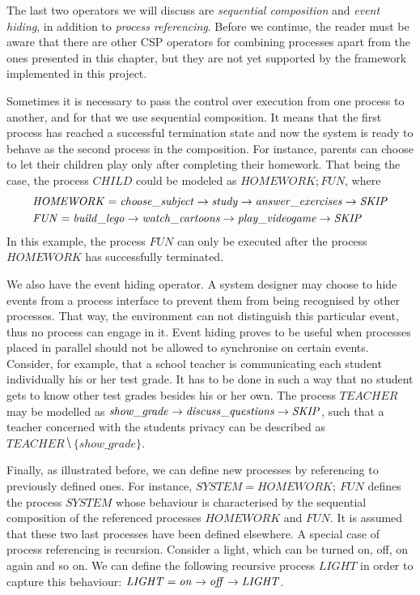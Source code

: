 The last two operators we will discuss are \emph{sequential composition} and \emph{event hiding}, in addition to \emph{process referencing}. Before we continue, the reader must be aware that there are other CSP operators for combining processes apart from the ones presented in this chapter, but they are not yet supported by the framework implemented in this project.

Sometimes it is necessary to pass the control over execution from one process to another, and for that we use sequential composition. It means that the first process has reached a successful termination state and now the system is ready to behave as the second process in the composition. For instance, parents can choose to let their children play only after completing their homework. That being the case, the process $ \mathit{CHILD} $ could be modeled as $ \mathit{HOMEWORK}\!; \mathit{FUN} $, where
\begin{align}
	&\mathit{HOMEWORK} = \mathit{choose\_subject} \mathrel{\rightarrow} \mathit{study} \mathrel{\rightarrow} \mathit{answer\_exercises} \mathrel{\rightarrow} \mathit{\mathord{{SKIP}}} \notag \\
	&\mathit{FUN} = \mathit{build\_lego} \mathrel{\rightarrow} \mathit{watch\_cartoons} \mathrel{\rightarrow} \mathit{play\_videogame} \mathrel{\rightarrow} \mathit{\mathord{{SKIP}}} \notag
\end{align}
In this example, the process $ \mathit{FUN} $ can only be executed after the process $ \mathit{HOMEWORK} $ has successfully terminated.

We also have the event hiding operator. A system designer may choose to hide events from a process interface to prevent them from being recognised by other processes. That way, the environment can not distinguish this particular event, thus no process can engage in it. Event hiding proves to be useful when processes placed in parallel should not be allowed to synchronise on certain events. Consider, for example, that a school teacher is communicating each student individually his or her test grade. It has to be done in such a way that no student gets to know other test grades besides his or her own. The process $ \mathit{TEACHER} $ may be modelled as $ \mathit{show\_grade} \mathrel{\rightarrow} \mathit{discuss\_questions} \mathrel{\rightarrow} \mathit{\mathord{{SKIP}}} $, such that a teacher concerned with the students privacy can be described as $ \mathit{TEACHER} \hide \{show\_grade\} $.

Finally, as illustrated before, we can define new processes by referencing to previously defined ones. For instance, $\mathit{SYSTEM} = \mathit{HOMEWORK}\!; \ \mathit{FUN} $ defines the process $\mathit{SYSTEM}$ whose behaviour is characterised by the sequential composition of the referenced processes $\mathit{HOMEWORK}$ and $\mathit{FUN}$. It is assumed that these two last processes have been defined elsewhere. A special case of process referencing is recursion. Consider a light, which can be turned on, off, on again and so on. We can define the following recursive process $ \mathit{LIGHT} $ in order to capture this behaviour: $\mathit{LIGHT} = \mathit{on} \mathrel{\rightarrow} \mathit{off} \mathrel{\rightarrow} \mathit{LIGHT}$.

